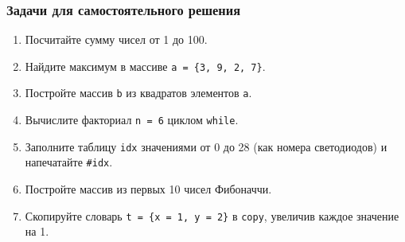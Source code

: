 \subsubsection*{Задачи для самостоятельного решения}
\begin{enumerate}
  \item Посчитайте сумму чисел от 1 до 100.
  \item Найдите максимум в массиве \verb|a = {3, 9, 2, 7}|.
  \item Постройте массив \verb|b| из квадратов элементов \verb|a|.
  \item Вычислите факториал \verb|n = 6| циклом \verb|while|.
  \item Заполните таблицу \verb|idx| значениями от 0 до 28 (как номера светодиодов) и напечатайте \verb|#idx|.
  \item Постройте массив из первых 10 чисел Фибоначчи.
  \item Скопируйте словарь \verb|t = {x = 1, y = 2}| в \verb|copy|, увеличив каждое значение на 1.
\end{enumerate}
